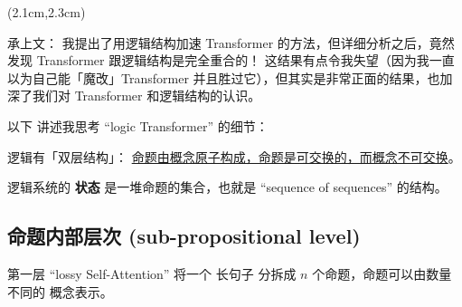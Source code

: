 \begin{preview}

\cc{
\title{\vspace{-1.5cm} \bfseries\color{blue}{\LARGE Transformer 完全符合逻辑结构}}
}{
\title{\vspace{-1.5cm} \bfseries\color{blue}{\LARGE Transformer Has Full Logic Structure}}
}

\date{\vspace{-2cm}} %

\maketitle

\setcounter{section}{-1}

\begin{textblock*}{5cm}(2.1cm,2.3cm) %
{}
\end{textblock*}

\begin{minipage}{\textwidth}
\setlength{\parskip}{0.4\baselineskip}

承上文： 我提出了用逻辑结构加速 Transformer 的方法，但详细分析之后，竟然发现 Transformer 跟逻辑结构是完全重合的！ 这结果有点令我失望（因为我一直以为自己能「魔改」Transformer 并且胜过它），但其实是非常正面的结果，也加深了我们对 Transformer 和逻辑结构的认识。

以下 讲述我思考 ``logic Transformer'' 的细节：

逻辑有「双层结构」： \uline{命题由概念原子构成，命题是可交换的，而概念不可交换}。 

逻辑系统的 \textbf{状态} 是一堆命题的集合，也就是 ``sequence of sequences'' 的结构。 


\subsection{命题内部层次 (sub-propositional level)}

第一层 ``lossy Self-Attention'' 将一个 长句子 分拆成 $n$ 个命题，命题可以由数量不同的 概念表示。 


\end{minipage}
\end{preview}
